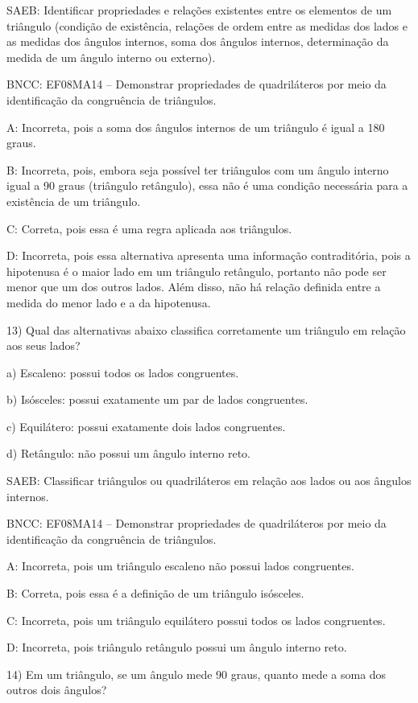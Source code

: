 SAEB: Identificar propriedades e relações existentes entre os elementos
de um triângulo (condição de existência, relações de ordem entre as
medidas dos lados e as medidas dos ângulos internos, soma dos ângulos
internos, determinação da medida de um ângulo interno ou externo).

BNCC: EF08MA14 -- Demonstrar propriedades de quadriláteros por meio da
identificação da congruência de triângulos.

A: Incorreta, pois a soma dos ângulos internos de um triângulo é igual a
180 graus.

B: Incorreta, pois, embora seja possível ter triângulos com um ângulo
interno igual a 90 graus (triângulo retângulo), essa não é uma condição
necessária para a existência de um triângulo.

C: Correta, pois essa é uma regra aplicada aos triângulos.

D: Incorreta, pois essa alternativa apresenta uma informação
contraditória, pois a hipotenusa é o maior lado em um triângulo
retângulo, portanto não pode ser menor que um dos outros lados. Além
disso, não há relação definida entre a medida do menor lado e a da
hipotenusa.

13) Qual das alternativas abaixo classifica corretamente um triângulo em
relação aos seus lados?

a) Escaleno: possui todos os lados congruentes.

b) Isósceles: possui exatamente um par de lados congruentes.

c) Equilátero: possui exatamente dois lados congruentes.

d) Retângulo: não possui um ângulo interno reto.

SAEB: Classificar triângulos ou quadriláteros em relação aos lados ou
aos ângulos internos.

BNCC: EF08MA14 -- Demonstrar propriedades de quadriláteros por meio da
identificação da congruência de triângulos.

A: Incorreta, pois um triângulo escaleno não possui lados congruentes.

B: Correta, pois essa é a definição de um triângulo isósceles.

C: Incorreta, pois um triângulo equilátero possui todos os lados
congruentes.

D: Incorreta, pois triângulo retângulo possui um ângulo interno reto.

14) Em um triângulo, se um ângulo mede 90 graus, quanto mede a soma dos
outros dois ângulos?


